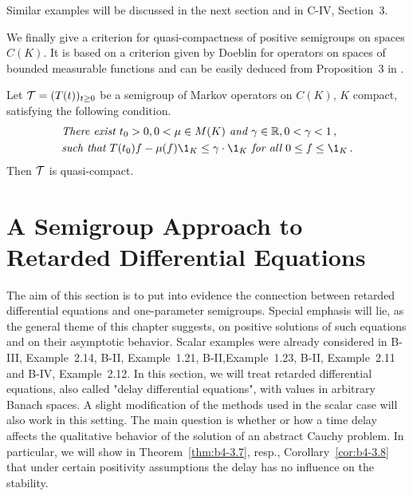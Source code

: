 Similar examples will be discussed in the next section and in  C-IV, Section~3.

We finally give a criterion for quasi-compactness of positive semigroups on spaces $C(K)$. 
It is based on a criterion given by Doeblin for operators on spaces of bounded measurable functions and can be easily deduced from  Proposition~3 in \citet{lotz:1981}.
\begin{proposition}\label{prop:b4-2.13}
	Let $\mathcal{T} = (T(t))_{t \geq 0}$ be a semigroup of Markov operators on $C(K)$, $K$ compact, satisfying the following condition.
	\begin{equation}\label{eq:b4-2.12}	
		\begin{aligned}		
		&\textit{There exist } t_{0} > 0, 0 < \mu \in M(K) \textit{ and }  \gamma \in \mathbb{R}, 0 < \gamma < 1\,,\\
		&\textit{such that } T(t_{0})f - \mu(f)\1_K \leq \gamma \cdot \1_K \textit{ for all }  0 \leq f \leq \1_K\,.
		\end{aligned}
	\end{equation}
	Then $\mathcal{T}$ is quasi-compact.
\end{proposition}
%
%
\newpage
\section{A Semigroup Approach to Retarded Differential Equations}
%	
The aim of this section is to put into evidence the connection between retarded differential equations and one-parameter semigroups.
Special emphasis will lie, as the general theme of this chapter suggests, on positive solutions of such equations and on their asymptotic behavior.
Scalar examples were already considered in B-III, Example~2.14, B-II, Example~1.21, B-II,Example~1.23, B-II, Example~2.11 and B-IV, Example~2.12.
In this section, we will treat retarded differential equations, also called "delay differential equations", with values in arbitrary Banach spaces.
A slight modification of the methods used in the scalar case will also work in this setting.
The main question is whether or how a time delay affects the qualitative behavior of the solution of an abstract Cauchy problem.
In particular, we will show in Theorem~\ref{thm:b4-3.7}, resp., Corollary~\ref{cor:b4-3.8} that under certain positivity assumptions the delay has no influence on the stability.

